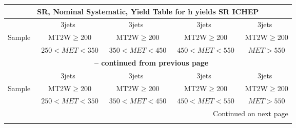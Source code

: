\documentclass{article}
\begin{document}
 
 
 
 
\pagebreak 

 
 
 
 
\begin{longtable}{|l|c|c|c|c|} 
 
\multicolumn{5}{c}{ SR, Nominal Systematic, Yield Table for h yields SR ICHEP }\\* \hline 
  & 3jets  & 3jets  & 3jets  & 3jets \\* 
Sample  & ~MT2W$\ge$200  & ~MT2W$\ge$200  & ~MT2W$\ge$200  & ~MT2W$\ge$200 \\* 
  & ~$250<MET<350$  & ~$350<MET<450$  & ~$450<MET<550$  & ~$MET>550$ \\* 
\hline \hline 
\endfirsthead 
 
\multicolumn{5}{c}{{\bfseries \tablename\ \thetable{} -- continued from previous page}}\\* \hline 
  & 3jets  & 3jets  & 3jets  & 3jets \\* 
Sample  & ~MT2W$\ge$200  & ~MT2W$\ge$200  & ~MT2W$\ge$200  & ~MT2W$\ge$200 \\* 
  & ~$250<MET<350$  & ~$350<MET<450$  & ~$450<MET<550$  & ~$MET>550$ \\* 
\hline \hline 
\endhead 
 
\multicolumn{5}{|r|}{{Continued on next page}}\\* \hline 
\endfoot 
 
 
\endlastfoot 
 

\end{longtable}
\end{document}

